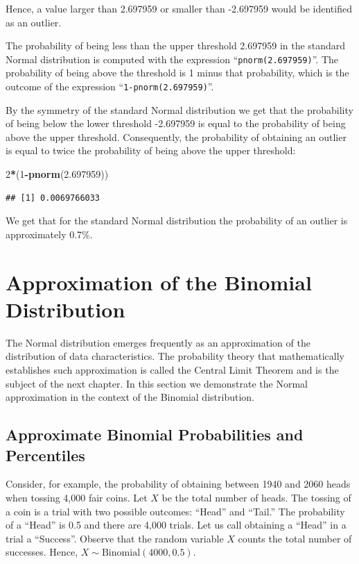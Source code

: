 \documentclass[]{krantz}
\makeatletter
\newenvironment{Shaded}{\begin{snugshade}}{\end{snugshade}}
\newcommand{\KeywordTok}[1]{\textcolor[rgb]{0.13,0.29,0.53}{\textbf{#1}}}
\newcommand{\DecValTok}[1]{\textcolor[rgb]{0.00,0.00,0.81}{#1}}
\newcommand{\FloatTok}[1]{\textcolor[rgb]{0.00,0.00,0.81}{#1}}
\newcommand{\OperatorTok}[1]{\textcolor[rgb]{0.81,0.36,0.00}{\textbf{#1}}}
\newcommand{\NormalTok}[1]{#1}
\newenvironment{kframe}{%
\medskip{}
\setlength{\fboxsep}{.8em}
 \def\at@end@of@kframe{}%
 \ifinner\ifhmode%
  \def\at@end@of@kframe{\end{minipage}}%
  \begin{minipage}{\columnwidth}%
 \fi\fi%
 \def\FrameCommand##1{\hskip\@totalleftmargin \hskip-\fboxsep
 \colorbox{shadecolor}{##1}\hskip-\fboxsep
     \hskip-\linewidth \hskip-\@totalleftmargin \hskip\columnwidth}%
 \MakeFramed {\advance\hsize-\width
   \@totalleftmargin\z@ \linewidth\hsize
   \@setminipage}}%
 {\par\unskip\endMakeFramed%
 \at@end@of@kframe}
\renewenvironment{Shaded}{\begin{kframe}}{\end{kframe}}
\theoremstyle{definition}
\theoremstyle{definition}
\theoremstyle{definition}
\theoremstyle{remark}
\makeatother
\begin{document}
Hence, a value larger than 2.697959 or smaller than -2.697959 would be
identified as an outlier.

The probability of being less than the upper threshold 2.697959 in the
standard Normal distribution is computed with the expression
``\texttt{pnorm(2.697959)}''. The probability of being above the
threshold is 1 minus that probability, which is the outcome of the
expression ``\texttt{1-pnorm(2.697959)}''.

By the symmetry of the standard Normal distribution we get that the
probability of being below the lower threshold -2.697959 is equal to the
probability of being above the upper threshold. Consequently, the
probability of obtaining an outlier is equal to twice the probability of
being above the upper threshold:

\begin{Shaded}
\begin{Highlighting}[]
\DecValTok{2}\OperatorTok{*}\NormalTok{(}\DecValTok{1}\OperatorTok{-}\KeywordTok{pnorm}\NormalTok{(}\FloatTok{2.697959}\NormalTok{))}
\end{Highlighting}
\end{Shaded}

\begin{verbatim}
## [1] 0.0069766033
\end{verbatim}

We get that for the standard Normal distribution the probability of an
outlier is approximately 0.7\%.

\section{Approximation of the Binomial
Distribution}\label{approximation-of-the-binomial-distribution}

The Normal distribution emerges frequently as an approximation of the
distribution of data characteristics. The probability theory that
mathematically establishes such approximation is called the Central
Limit Theorem and is the subject of the next chapter. In this section we
demonstrate the Normal approximation in the context of the Binomial
distribution.

\subsection{Approximate Binomial Probabilities and
Percentiles}\label{approximate-binomial-probabilities-and-percentiles}

Consider, for example, the probability of obtaining between 1940 and
2060 heads when tossing 4,000 fair coins. Let \(X\) be the total number
of heads. The tossing of a coin is a trial with two possible outcomes:
``Head'' and ``Tail.'' The probability of a ``Head'' is 0.5 and there
are 4,000 trials. Let us call obtaining a ``Head'' in a trial a
``Success''. Observe that the random variable \(X\) counts the total
number of successes. Hence, \(X \sim \mathrm{Binomial}(4000,0.5)\).
\end{document}
